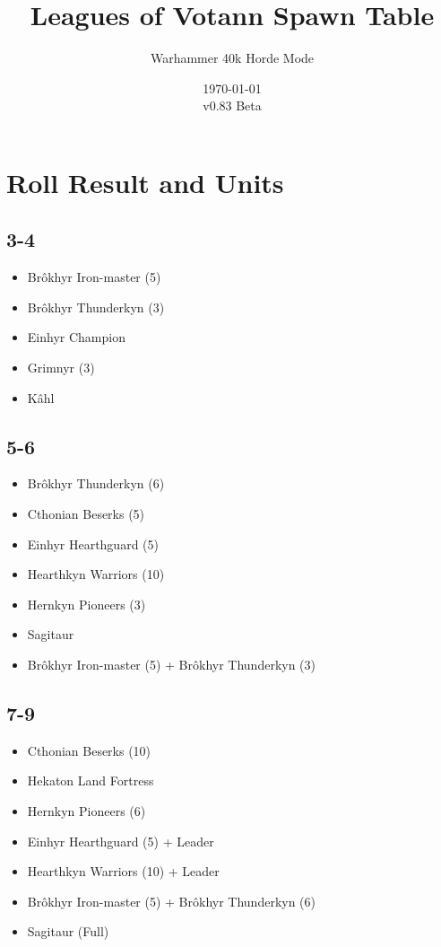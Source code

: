 \documentclass{HordeModeTarot}
\title{Leagues of Votann Spawn Table}
\author{Warhammer 40k Horde Mode}
\date{\today \\v0.83 Beta}
\begin{document}
\maketitle

\outputUsingSpawnTableBoilerplate
\section{Roll Result and Units}\hypertarget{roll-results}{}\label{roll-results}

\begin{multicols}{2}

\subsection*{3-4}

\begin{itemize}[leftmargin=*]
\item[] Brôkhyr Iron-master (5)
\item[] Brôkhyr Thunderkyn (3)
\item[] Einhyr Champion
\item[] Grimnyr (3)
\item[] Kâhl
\end{itemize}

\subsection*{5-6}

\begin{itemize}[leftmargin=*]
\item[] Brôkhyr Thunderkyn (6)
\item[] Cthonian Beserks (5)
\item[] Einhyr Hearthguard (5)
\item[] Hearthkyn Warriors (10)
\item[] Hernkyn Pioneers (3)
\item[] Sagitaur
\item[] Brôkhyr Iron-master (5) + Brôkhyr Thunderkyn (3)
\end{itemize}

\subsection*{7-9}

\begin{itemize}[leftmargin=*]
\item[] Cthonian Beserks (10)
\item[] Hekaton Land Fortress
\item[] Hernkyn Pioneers (6)
\item[] Einhyr Hearthguard (5) + Leader
\item[] Hearthkyn Warriors (10) + Leader
\item[] Brôkhyr Iron-master (5) + Brôkhyr Thunderkyn (6)
\item[] Sagitaur (Full)
\end{itemize}


\end{multicols}
\end{document}
